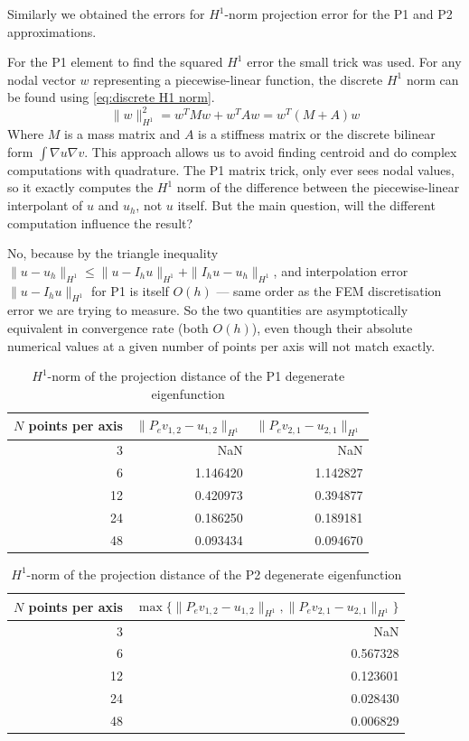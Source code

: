 \documentclass[acmsmall,screen]{MapleTrans}
\begin{document}
Similarly we obtained the errors for $H^1$-norm projection error for the P1 and P2 approximations.

For the P1 element to find the squared $H^1$ error the small trick was used. For any nodal vector $w$ representing a piecewise-linear function, the discrete $H^1$ norm can be found using \eqref{eq:discrete H1 norm}.
\begin{equation}
    \|w\|_{H^1}^2 = w^T Mw + w^T Aw = w^T(M + A)w
    \label{eq:discrete H1 norm}
\end{equation}
Where $M$ is a mass matrix and $A$ is a stiffness matrix or the discrete bilinear form $\int\nabla u\nabla v$. This approach allows us to avoid finding centroid and do complex computations with quadrature.
The P1 matrix trick, only ever sees nodal values, so it exactly computes the $H^1$ norm of the difference between the piecewise-linear interpolant of $u$ and $u_h$, not $u$ itself. But the main question, will the different computation influence the result?

No, because by the triangle inequality $\|u - u_h\|_{H^1} \leq \|u - I_hu\|_{H^1} + \|I_hu - u_h\|_{H^1}$, and interpolation error $\|u - I_hu\|_{H^1}$ for P1 is itself $O(h)$ — same order as the FEM discretisation error we are trying to measure. So the two quantities are asymptotically equivalent in convergence rate (both $O(h)$), even though their absolute numerical values at a given number of points per axis will not match exactly.
\begin{table}[H]
    \centering
    \caption{$H^1$-norm of the projection distance of the P1 degenerate eigenfunction}
    \label{tab:H1 projection errors P1}
    \begin{tabular}{rrr}
        \toprule
        $N$ points per axis & $\|P_ev_{1,2} - u_{1,2}\|_{H^1}$ & $\|P_ev_{2,1} - u_{2,1}\|_{H^1}$ \\
        \midrule
        3 & NaN & NaN \\
        6 & 1.146420 & 1.142827 \\
        12 & 0.420973 & 0.394877 \\
        24 & 0.186250 & 0.189181 \\
        48 & 0.093434 & 0.094670 \\
        \bottomrule
    \end{tabular}
\end{table}
\begin{table}[H]
    \centering
    \caption{$H^1$-norm of the projection distance of the P2 degenerate eigenfunction}
    \label{tab:H1 projection errors P2}
    \begin{tabular}{rr}
        \toprule
        $N$ points per axis & $\max\{\|P_ev_{1,2} - u_{1,2}\|_{H^1}, \|P_ev_{2,1} - u_{2,1}\|_{H^1}\}$ \\
        \midrule
        3 & NaN \\
        6 & 0.567328 \\
        12 & 0.123601 \\
        24 & 0.028430 \\
        48 & 0.006829 \\
        \bottomrule
    \end{tabular}
\end{table}
\end{document}
